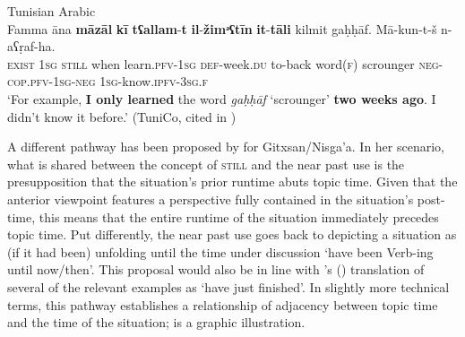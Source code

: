 \begin{exe}
	\ex Tunisian Arabic\label{exRemotenessTATwoWeeks}\\
	\gll Famma āna \textbf{māzāl} \textbf{kī} \textbf{tʕallam}-\textbf{t} \textbf{il}-\textbf{žimᵊʕtīn} \textbf{it}-\textbf{tāli} kilmit gaḥḥāf. Mā-kun-t-š n-aʕṛaf-ha.\\
	\textsc{exist} 1\textsc{sg} \textsc{still} when learn.\textsc{pfv}-1\textsc{sg} \textsc{def}-week.\textsc{du} to-back word(\textsc{f}) scrounger \textsc{neg}-\textsc{cop}.\textsc{pfv}-1\textsc{sg}-\textsc{neg} 1\textsc{sg}-know.\textsc{ipfv}-3\textsc{sg}.\textsc{f}\\
	\glt \lq For example, \textbf{I only learned} the word \textit{gaḥḥāf} \lq scrounger' \textbf{two weeks ago}. I didn't know it before.' (TuniCo, cited in \cite{FischerEtAlTunisian})
\end{exe}

A different pathway has been proposed by \textcite{Aonuki2021} for Gitxsan/Nisga'a.  In her scenario, what is shared between the concept of \textsc{still} and the near past use is the presupposition that the situation's prior runtime abuts topic time. Given that the anterior viewpoint features a perspective fully contained in the situation's post-time, this means that the entire runtime of the situation immediately precedes topic time. Put differently, the near past use goes back to depicting a situation as (if it had been) unfolding until the time under discussion \lq have been Verb-ing until now/then'. This proposal would also be in line with \citeauthor{Abe2015}'s (\citeyear{Abe2015}) translation of several of the relevant  examples as \lq have just finished'. In slightly more technical terms, this pathway establishes a relationship of adjacency between topic time and the time of the situation;  is a graphic illustration.

